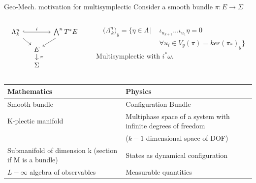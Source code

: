 \documentclass[handout,10pt]{beamer}
\begin{document}
  
  \begin{frame}[fragile]{Geo-Mech. motivation for multisymplectic} 
	Consider a smooth bundle $\pi: E\rightarrow \Sigma$
	\vspace{1em}
  	\begin{defblock}
		\begin{columns}
	    \begin{column}{.4\linewidth}
			\[
			\begin{tikzcd}[column sep= small,row sep=small]
				\Lambda^n_k  \ar[rr,hookrightarrow,"i"] \ar[dr]& & \bigwedge^n T^\ast E \ar[dl]\\
				& E \ar[d,"\; \pi"] & \\
				& \Sigma &
			\end{tikzcd}	
			\]
	    \end{column}  
		    \begin{column}{.6\linewidth}
			    	\begin{displaymath}
				    	\begin{split}
				    		\big(\Lambda^n_{\, k} \big)_y = 
				    		\big\lbrace \eta \in \Lambda \, \big\vert \;& \iota_{u_{k+1}}\ldots \iota_{u_1} \eta = 0 \\
				    		& \forall u_i \in V_y(\pi) = ker(\pi_\ast)_y \big\rbrace
				    	\end{split}	    		
			    	\end{displaymath}
			    	Multisymplectic with $i^\ast \omega$.
		    \end{column}  
		\end{columns}
  	\end{defblock}
  	
	\begin{table}[]
	\begin{tabular}{|p{14em}|p{14em}|}
		\hline
		\textbf{Mathematics}                   & \textbf{Physics}\\
		\hline
		Smooth bundle							  & Configuration Bundle \\
		K-plectic manifold                       & Multiphase space of a system with infinite degrees of freedom\\ 
		& \footnotesize ($k-1$ dimensional space of DOF)\\
		Submanifold of dimension k  (section if M is a bundle) & States as dynamical configuration  \\
		$L-\infty$ algebra of observables                     & Measurable quantities\\
		\hline
	\end{tabular}
	\end{table}
  \end{frame}
\end{document}

